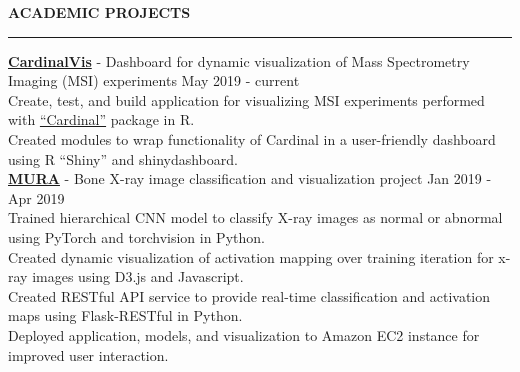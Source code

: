 \documentclass[a4paper]{article}
\newcommand{\myline}{\par
  \kern2pt %
  \hrule height 0.5pt
  \kern2pt %
}
\newcommand{\mybullet}{
	\indent \textbullet \hspace*{2mm}
}
\begin{document}
	
	
\noindent
{\large \textbf{ACADEMIC PROJECTS}}
\myline 
\smallskip

      \noindent
      \textbf{\href{https://github.com/kuwisdelu/CardinalVis/}{CardinalVis}} - 
      Dashboard for dynamic visualization of Mass Spectrometry Imaging (MSI) experiments 
      \hfill May 2019 - current \\
      \mybullet Create, test, and build application for visualizing MSI experiments performed with \href{https://github.com/kuwisdelu/Cardinal}{``Cardinal''} package in R. \\
      \mybullet Created modules to wrap functionality of Cardinal in a user-friendly 
      dashboard using R ``Shiny'' and shinydashboard. \\

      \noindent
      \textbf{\href{https://github.com/DarkestFloyd/DS5500Project}{MURA}} - Bone X-ray image 
      classification and visualization project \hfill Jan 2019 - Apr 2019 \\
      \mybullet Trained hierarchical CNN model to classify X-ray images as normal or abnormal 
      using PyTorch and torchvision in Python. \\
      \mybullet Created dynamic visualization of activation mapping over training iteration for 
      x-ray images using D3.js and Javascript. \\
      \mybullet Created RESTful API service to provide real-time classification and 
      activation maps using Flask-RESTful in Python. \\
      \mybullet Deployed application, models, and visualization to Amazon EC2 instance for 
      improved user interaction. \\
\end{document}

